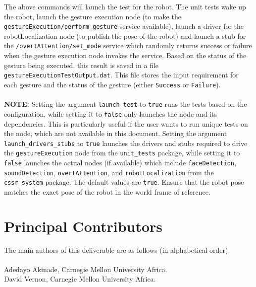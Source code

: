 \documentclass{CSSRforAfrica}
\newcommand{\blank}{~\\}
\begin{document}
The above commands will launch the test for the robot. The unit tests wake up the robot, launch the gesture execution node (to make the \texttt{gestureExecution/perform\_gesture} service available), launch a driver for the robotLocalization node (to publish the pose of the robot) and launch a stub for the \texttt{/overtAttention/set\_mode} service which randomly returns success or failure when the gesture execution node invokes the service. Based on the status of the gesture being executed, this result is saved in a file \texttt{gestureExecutionTestOutput.dat}. This file stores the input requirement for each gesture and the status of the gesture (either \texttt{Success} or \texttt{Failure}). \\~\\

{\color{red}
\noindent \textbf{NOTE:}
}
Setting the argument \texttt{launch\_test} to \texttt{true} runs the tests based on the configuration, while setting it to \texttt{false} only launches the node and its dependencies. This is particularly useful if the user wants to run unique tests on the node, which are not available in this document. Setting the argument \texttt{launch\_drivers\_stubs} to \texttt{true} launches the drivers and stubs required to drive the \texttt{gestureExecution} node from the \texttt{unit\_tests} package, while setting it to \texttt{false} launches the actual nodes (if available) which include \texttt{faceDetection},  \texttt{soundDetection},  \texttt{overtAttention}, and  \texttt{robotLocalization} from the  \texttt{cssr\_system} package. The default values are  \texttt{true}. Ensure that the robot pose matches the exact pose of the robot in the world frame of reference.






\newpage




\pagebreak
\section*{Principal Contributors}
\label{contributors}
The main authors of this deliverable are as follows (in alphabetical order).
\blank
~
\blank
Adedayo Akinade, Carnegie Mellon University Africa.\\ 
David Vernon, Carnegie Mellon University Africa.\\   
\end{document}

